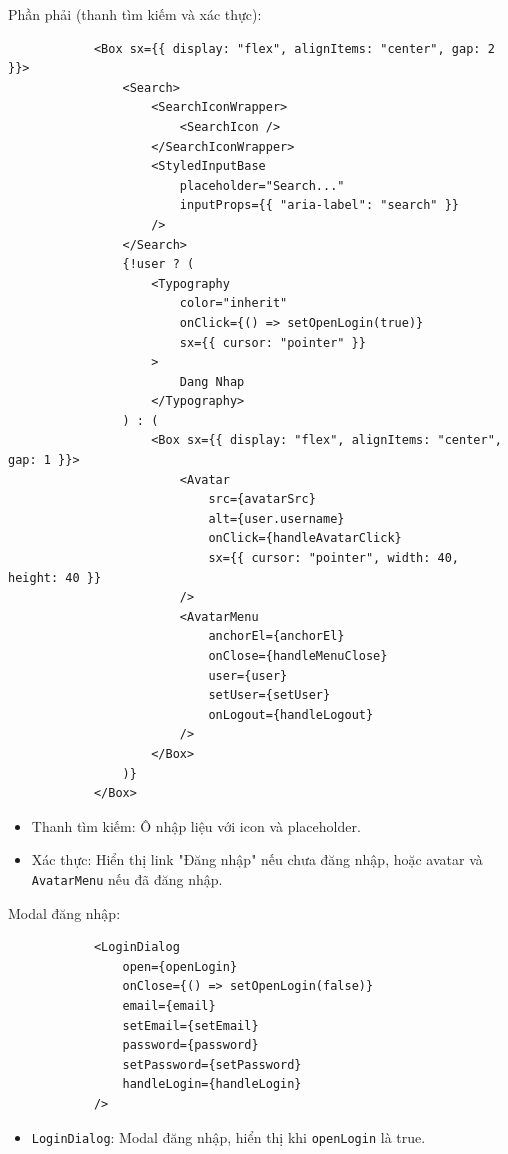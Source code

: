                 Phần phải (thanh tìm kiếm và xác thực):
                \begin{lstlisting}
            <Box sx={{ display: "flex", alignItems: "center", gap: 2 }}>
                <Search>
                    <SearchIconWrapper>
                        <SearchIcon />
                    </SearchIconWrapper>
                    <StyledInputBase
                        placeholder="Search..."
                        inputProps={{ "aria-label": "search" }}
                    />
                </Search>
                {!user ? (
                    <Typography
                        color="inherit"
                        onClick={() => setOpenLogin(true)}
                        sx={{ cursor: "pointer" }}
                    >
                        Dang Nhap
                    </Typography>
                ) : (
                    <Box sx={{ display: "flex", alignItems: "center", gap: 1 }}>
                        <Avatar
                            src={avatarSrc}
                            alt={user.username}
                            onClick={handleAvatarClick}
                            sx={{ cursor: "pointer", width: 40, height: 40 }}
                        />
                        <AvatarMenu
                            anchorEl={anchorEl}
                            onClose={handleMenuClose}
                            user={user}
                            setUser={setUser}
                            onLogout={handleLogout}
                        />
                    </Box>
                )}
            </Box>
                \end{lstlisting}
                \begin{itemize}
                    \item Thanh tìm kiếm: Ô nhập liệu với icon và placeholder.
                    \item Xác thực: Hiển thị link "Đăng nhập" nếu chưa đăng nhập, hoặc avatar và \texttt{AvatarMenu} nếu đã đăng nhập.
                \end{itemize}

                Modal đăng nhập:
                \begin{lstlisting}
            <LoginDialog
                open={openLogin}
                onClose={() => setOpenLogin(false)}
                email={email}
                setEmail={setEmail}
                password={password}
                setPassword={setPassword}
                handleLogin={handleLogin}
            />
                \end{lstlisting}
                \begin{itemize}
                    \item \texttt{LoginDialog}: Modal đăng nhập, hiển thị khi \texttt{openLogin} là true.
                \end{itemize}
